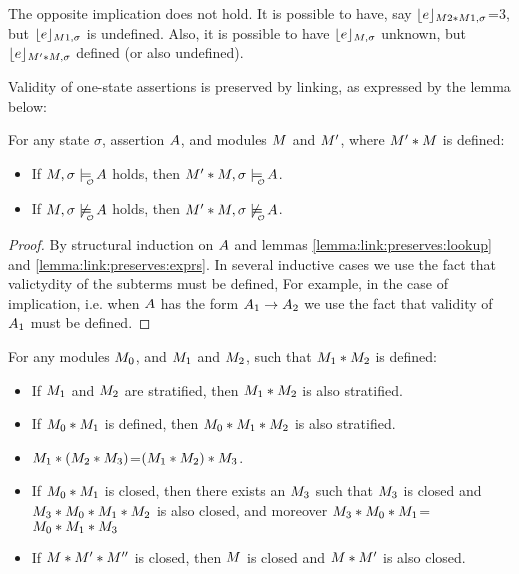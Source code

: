  The opposite implication does not hold. It is possible to have, say  ${\lfloor{ {e}}\rfloor_{M2*M1,\sigma}}$=$3$, but  ${\lfloor{ {e}}\rfloor_{M1,\sigma}}$ is undefined. Also, it is possible to have ${\lfloor{ {e}}\rfloor_{M,\sigma}}$ unknown,  but ${\lfloor{ {e}}\rfloor_{M'*M,\sigma}}$   defined (or also undefined).

{Validity of one-state assertions is preserved by linking, as expressed by the lemma below:}

{\begin{lemma}
\label{lemma:link:preserves:exprs}
For any state $\sigma$, assertion $A$, and modules $M$ and $M'$, where $M'*M$ is defined:\\
\begin{itemize}
\item
If  $\M,\sigma  \modelsWithO  \A$ holds, then  $\M'*\M,\sigma  \modelsWithO  \A$.
\item
If  $\M,\sigma  \not\modelsWithO  \A$ holds, then  $\M'*\M,\sigma  \not\modelsWithO  \A$.
\end{itemize}
\end{lemma}
\begin{proof}
By structural induction on $A$ and   lemmas \ref{lemma:link:preserves:lookup} and \ref{lemma:link:preserves:exprs}. In several inductive cases we
use the fact that valictydity of the subterms must be defined, For example, in the case of implication,
i.e. when $A$ has the form $A_1 \rightarrow A_2$ we  use the fact that validity of $A_1$ must be defined.  \end{proof}




 \begin{lemma}
 For any modules $M_0$, and $M_1$ and $M_2$, such that $M_1*M_2$ is defined:
 \label{lemma:linking:properties}
 \begin{itemize}
     \item
    If $M_1$ and $M_2$ are stratified,   then $M_1*M_2$ is also stratified.
    \item
    If $M_0*M_1$ is defined,   then $M_0*M_1*M_2$ is also stratified.
    \item
    $M_1*(M_2*M_3)$=$(M_1*M_2)*M_3$.
    \item
    If $M_0*M_1$ is closed,   then there exists an $M_3$ such that $M_3$ is closed and
    $M_3*M_0*M_1*M_2$ is also closed, and moreover $M_3*M_0*M_1$=$M_0*M_1*M_3$
    \item
    If $M*M'*M''$ is closed,   then  $M$  is closed and
    $M*M'$ is also closed.
 \end{itemize}


\end{lemma}}
